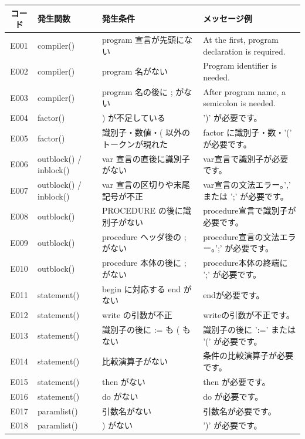 \documentclass[11pt,a4paper,dvipdfmx]{bxjsarticle}
\begin{document}
\begin{table}[!ht]
\centering
\small
\setlength{\tabcolsep}{4pt}
\renewcommand{\arraystretch}{1.15}
\begin{tabularx}{\linewidth}{|c|>{\raggedright\arraybackslash}X|>{\raggedright\arraybackslash}X|>{\raggedright\arraybackslash}X|}
\hline
\textbf{コード} & \textbf{発生関数} & \textbf{発生条件} & \textbf{メッセージ例} \\
\hline
E001 & compiler() & program 宣言が先頭にない & At the first, program declaration is required. \\
E002 & compiler() & program 名がない & Program identifier is needed. \\
E003 & compiler() & program 名の後に ; がない & After program name, a semicolon is needed. \\
E004 & factor() & ) が不足している & ')' が必要です。 \\
E005 & factor() & 識別子・数値・( 以外のトークンが現れた & factor に識別子・数・'(' が必要です。 \\
E006 & outblock() / inblock() & var 宣言の直後に識別子がない & var宣言で識別子が必要です。 \\
E007 & outblock() / inblock() & var 宣言の区切りや末尾記号が不正 & var宣言の文法エラー。',' または ';' が必要です。 \\
E008 & outblock() & PROCEDURE の後に識別子がない & procedure宣言で識別子が必要です。 \\
E009 & outblock() & procedure ヘッダ後の ; がない & procedure宣言の文法エラー。';' が必要です。 \\
E010 & outblock() & procedure 本体の後に ; がない & procedure本体の終端に ';' が必要です。 \\
E011 & statement() & begin に対応する end がない & endが必要です。 \\
E012 & statement() & write の引数が不正 & writeの引数が不正です。 \\
E013 & statement() & 識別子の後に := も ( もない & 識別子の後に ':=' または '(' が必要です。 \\
E014 & statement() & 比較演算子がない & 条件の比較演算子が必要です。 \\
E015 & statement() & then がない & then が必要です。 \\
E016 & statement() & do がない & do が必要です。 \\
E017 & paramlist() & 引数名がない & 引数名が必要です。 \\
E018 & paramlist() & ) がない & ')' が必要です。 \\

\end{tabularx}
\end{table}
\end{document}
